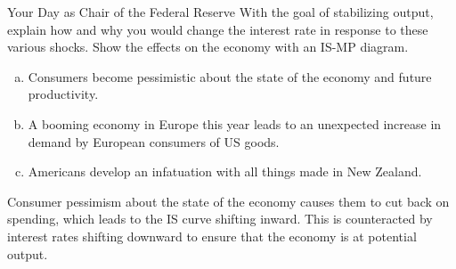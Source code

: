 \documentclass[10pt]{extarticle}
\begin{document}
  \begin{problem}{Your Day as Chair of the Federal Reserve}
    With the goal of stabilizing output, explain how and why you would change the interest rate in response to these various shocks. Show the effects on the economy with an IS-MP diagram.
    \begin{enumerate}[(a)]
      \item Consumers become pessimistic about the state of the economy and future productivity.
      \item A booming economy in Europe this year leads to an unexpected increase in demand by European consumers of US goods.
      \item Americans develop an infatuation with all things made in New Zealand.
    \end{enumerate}
    \tcblower
    \begin{tcolorbox}[colback = white, title = (a), breakable]
      Consumer pessimism about the state of the economy causes them to cut back on spending, which leads to the IS curve shifting inward. This is counteracted by interest rates shifting downward to ensure that the economy is at potential output.
      \begin{center}
      \end{center}
    \end{tcolorbox}
    \begin{tcolorbox}[colback = white, title = (b), breakable]

\end{tcolorbox}
\end{problem}
\end{document}
